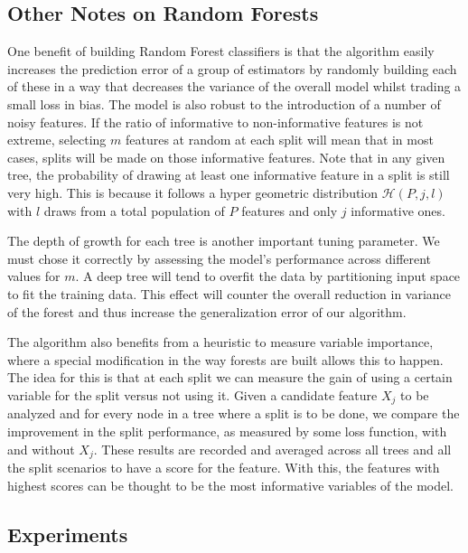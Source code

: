 %


\subsection{Other Notes on Random Forests}\label{subsection:random_forests_other_notes}

One benefit of building Random Forest classifiers is that the algorithm easily increases the prediction error of a group of estimators by randomly building each of these in a way that decreases the variance of the overall model whilst trading a small loss in bias. The model is also robust to the introduction of a number of noisy features. If the ratio of informative to non-informative features is not extreme, selecting $m$ features at random at each split will mean that in most cases, splits will be made on those informative features. Note that in any given tree, the probability of drawing at least one informative feature in a split is still very high. This is because it follows a hyper geometric distribution $\mathcal{H}(P,j,l)$ with $l$ draws from a total population of $P$ features and only $j$ informative ones.

The depth of growth for each tree is another important tuning parameter. We must chose it correctly by assessing the model's performance across different values for $m$. A deep tree will tend to overfit the data by partitioning input space to fit the training data. This effect will counter the overall reduction in variance of the forest and thus increase the generalization error of our algorithm.


The algorithm also benefits from a heuristic to measure variable importance, where a special modification in the way forests are built allows this to happen.
The idea for this is that at each split we can measure the gain of using a certain variable for the split versus not using it. Given a candidate feature $X_j$ to be analyzed and for every node in a tree where a split is to be done, we compare the improvement in the split performance, as measured by some loss function, with and without $X_j$.
These results are recorded and averaged across all trees and all the split scenarios to have a score for the feature.
With this, the features with highest scores can be thought to be the most informative variables of the model.

\subsection{Experiments}\label{subsection:random_forests_experiments}

